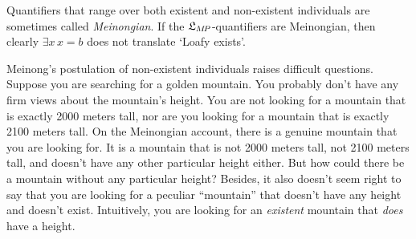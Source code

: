 Quantifiers that range over both existent and non-existent individuals are sometimes
called \emph{Meinongian}. If the $\mathfrak{L}_{M\!P}$-quantifiers are Meinongian, then
clearly $\exists x\, x\!=\!b$ does not translate `Loafy exists'.

Meinong's postulation of non-existent individuals raises difficult questions.
Suppose you are searching for a golden mountain. You probably don't have any
firm views about the mountain's height. You are not looking for a mountain that
is exactly 2000 meters tall, nor are you looking for a mountain that is exactly
2100 meters tall. On the Meinongian account, there is a genuine mountain that
you are looking for. It is a mountain that is not 2000 meters tall, not 2100
meters tall, and doesn't have any other particular height either. But how could
there be a mountain without any particular height? Besides, it also doesn't seem
right to say that you are looking for a peculiar ``mountain'' that doesn't have
any height and doesn't exist. Intuitively, you are looking for an
\emph{existent} mountain that \emph{does} have a height.




